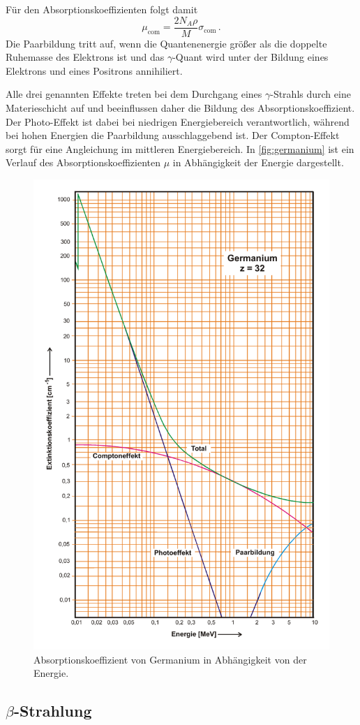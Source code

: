 Für den Absorptionskoeffizienten folgt damit
\begin{equation}
    \mu_\text{com}=\frac{2 N_{A} \rho}{M} \sigma_\text{com} \, .
\end{equation}
Die Paarbildung tritt auf, wenn die Quantenenergie größer als die doppelte Ruhemasse des Elektrons ist
und das $\gamma$-Quant wird unter der Bildung eines Elektrons und eines Positrons annihiliert.

Alle drei genannten Effekte treten bei dem Durchgang eines $\gamma$-Strahls durch eine Materieschicht auf
und beeinflussen daher die Bildung des Absorptionskoeffizient.
Der Photo-Effekt ist dabei bei niedrigen Energiebereich verantwortlich, während bei hohen Energien die Paarbildung ausschlaggebend ist. 
Der Compton-Effekt sorgt für eine Angleichung im mittleren Energiebereich. 
In \autoref{fig:germanium} ist ein Verlauf des Absorptionskoeffizienten $\mu$ in Abhängigkeit der Energie dargestellt.
\begin{figure}
    \centering
    \includegraphics[width=0.6\linewidth]{pictures/germanium.pdf}
    \caption{Absorptionskoeffizient von Germanium in Abhängigkeit von der Energie. \cite{v704}}
    \label{fig:germanium}
\end{figure}


\subsection[Beta-Strahlung]{$\beta$-Strahlung}

